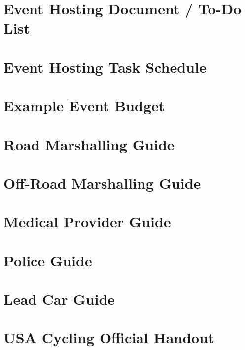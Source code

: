 \documentclass[
  letterpaper, %
  fontsize=10pt, %
  twoside=true,
  chapterentrydots=true, %
  numbers=noenddot,
  fontmethod=tex,
]{kaobook}
\begin{document}
\setchapterpreamble[u]{\margintoc}
\chapter{Event Hosting Document / To-Do List}

\setchapterpreamble[u]{\margintoc}
\chapter{Event Hosting Task Schedule}

\setchapterpreamble[u]{\margintoc}
\chapter{Example Event Budget}

\setchapterpreamble[u]{\margintoc}
\chapter{Road Marshalling Guide}

\setchapterpreamble[u]{\margintoc}
\chapter{Off-Road Marshalling Guide}

\setchapterpreamble[u]{\margintoc}
\chapter{Medical Provider Guide}

\setchapterpreamble[u]{\margintoc}
\chapter{Police Guide}

\setchapterpreamble[u]{\margintoc}
\chapter{Lead Car Guide}


\setchapterpreamble[u]{\margintoc}
\chapter{USA Cycling Official Handout}

\backmatter
{}


\printindex

\end{document}
